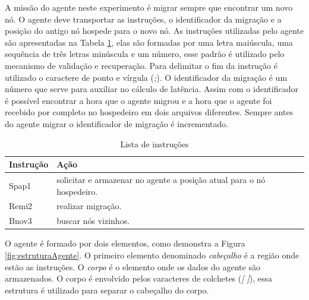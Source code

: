 A missão do agente neste experimento é migrar sempre que encontrar um novo nó. O agente deve transportar as instruções, o identificador da migração e a posição do antigo nó hospede para o novo nó. As instruções utilizadas pelo agente são apresentadas na Tabela \ref{tab:instrucoesAgente}, elas são formadas por uma letra maiúscula, uma sequência de três letras minúscula e um número, esse padrão é utilizado pelo mecanismo de validação e recuperação. Para delimitar o fim da instrução é utilizado o caractere de ponto e vírgula (\emph{;}). O identificador da migração é um número que serve para auxiliar no cálculo de latência. Assim com o identificador é possível encontrar a hora que o agente migrou e a hora que o agente foi recebido por completo no hospedeiro em dois arquivos diferentes. Sempre antes do agente migrar o identificador de migração é incrementado.  

\begin{table}[ht]
	\centering
	\begin{tabular}{ | l | l |}
		\hline
		Instrução &  Ação \\ \hline
		Spap1 & solicitar e armazenar no agente a posição atual para o nó hospedeiro.\\ \hline
		Remi2 & realizar migração.\\ \hline
		Bnov3 & buscar nós vizinhos. \\ \hline 
	\end{tabular}
	\caption{Lista de instruções}
	\label{tab:instrucoesAgente}
\end{table}

O agente é formado por dois elementos, como demonstra a Figura \ref{fig:estruturaAgente}. O primeiro elemento denominado \emph{cabeçalho} é a região onde estão as instruções. O \emph{corpo} é o elemento onde os dados do agente são armazenados. O corpo é envolvido pelos caracteres de colchetes (\emph{[ ]}), essa estrutura é utilizado para separar o cabeçalho do corpo.

